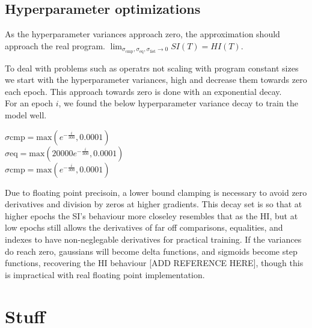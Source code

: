 \documentclass{article}
\begin{document}
\subsection*{Hyperparameter optimizations}
As the hyperparameter variances approach zero, the approximation should approach the real program. $\lim_{\sigma_{\text{cmp}}, \sigma_{\text{eq}}, \sigma_{\text{list}} \rightarrow 0} SI(T) = HI(T)$.

To deal with problems such as operatrs not scaling with program constant sizes we start with the hyperparameter variances, high and decrease them towards zero each epoch. This approach towards zero is done with an exponential decay.\\

For an epoch $i$, we found the below hyperparameter variance decay to train the model well. 
\begin{center}
  $\sigma{\text{cmp}} = \text{max}(e^{-\frac{i}{300}}, 0.0001)$\\
  $\sigma{\text{eq}} = \text{max}(20000e^{-\frac{i}{300}}, 0.0001)$\\
  $\sigma{\text{cmp}} = \text{max}(e^{-\frac{i}{300}}, 0.0001)$\\
\end{center}
Due to floating point precisoin, a lower bound clamping is necessary to avoid zero derivatives and division by zeros at higher gradients. This decay set is so that at higher epochs the SI's behaviour more closeley resembles that as the HI, but at low epochs still allows the derivatives of far off comparisons, equalities, and indexes to have non-neglegable derivatives for practical training. If the variances do reach zero, gaussians will become delta functions, and sigmoids become step functions, recovering the HI behaviour [ADD REFERENCE HERE], though this is impractical with real floating point implementation.

\section*{Stuff}
\end{document}
